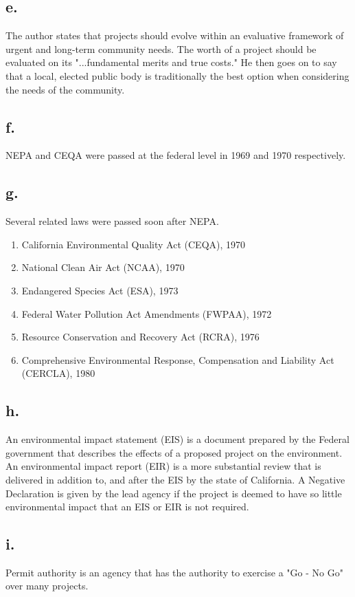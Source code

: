 \documentclass[12pt]{article}
\renewcommand{\=}[1]{\stackrel{#1}{=}} %
\theoremstyle{definition}
\theoremstyle{remark}
\begin{document}
\subsection{e.}
The author states that projects should evolve within an evaluative framework of urgent and long-term community needs. The worth of a project should be evaluated on its "...fundamental merits and true costs." He then goes on to say that a local, elected public body is traditionally the best option when considering the needs of the community.

\subsection{f.}
NEPA and CEQA were passed at the federal level in 1969 and 1970 respectively. 

\subsection{g.}
Several related laws were passed soon after NEPA.
\begin{enumerate}
	\item California Environmental Quality Act (CEQA), 1970
	\item National Clean Air Act (NCAA), 1970
	\item Endangered Species Act (ESA), 1973
	\item Federal Water Pollution Act Amendments (FWPAA), 1972
	\item Resource Conservation and Recovery Act (RCRA), 1976
	\item Comprehensive Environmental Response, Compensation and Liability Act (CERCLA), 1980
\end{enumerate}			

\subsection{h.}
An environmental impact statement (EIS) is a document prepared by the Federal government that describes the effects of a proposed project on the environment. An environmental impact report (EIR) is a more substantial review that is delivered in addition to, and after the EIS by the state of California. A Negative Declaration is given by the lead agency if the project is deemed to have so little environmental impact that an EIS or EIR is not required.

\subsection{i.}
Permit authority is	an agency that has the authority to exercise a "Go - No Go" over many projects. 
\end{document}

